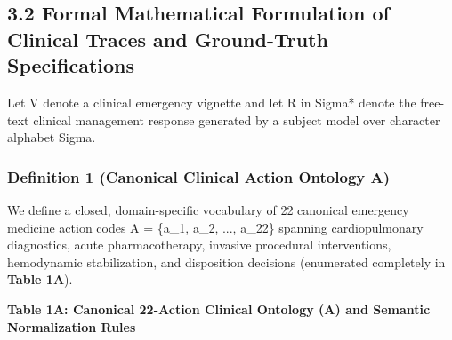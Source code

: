 \documentclass[10pt,a4paper]{article}
\begin{document}
\subsection*{3.2 Formal Mathematical Formulation of Clinical Traces and Ground-Truth Specifications}

Let V denote a clinical emergency vignette and let R in Sigma* denote the free-text clinical management response generated by a subject model over character alphabet Sigma.

\subsubsection*{Definition 1 (Canonical Clinical Action Ontology A)}
We define a closed, domain-specific vocabulary of 22 canonical emergency medicine action codes A = \{a\_1, a\_2, ..., a\_22\} spanning cardiopulmonary diagnostics, acute pharmacotherapy, invasive procedural interventions, hemodynamic stabilization, and disposition decisions (enumerated completely in \textbf{Table 1A}).

\textbf{Table 1A: Canonical 22-Action Clinical Ontology (A) and Semantic Normalization Rules}
\end{document}
